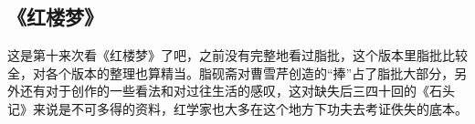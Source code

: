 \subsection{《红楼梦》}
这是第十来次看《红楼梦》了吧，之前没有完整地看过脂批，这个版本里脂批比较全，对各个版本的整理也算精当。脂砚斋对曹雪芹创造的“捧”占了脂批大部分，另外还有对于创作的一些看法和对过往生活的感叹，这对缺失后三四十回的《石头记》来说是不可多得的资料，红学家也大多在这个地方下功夫去考证佚失的底本。

